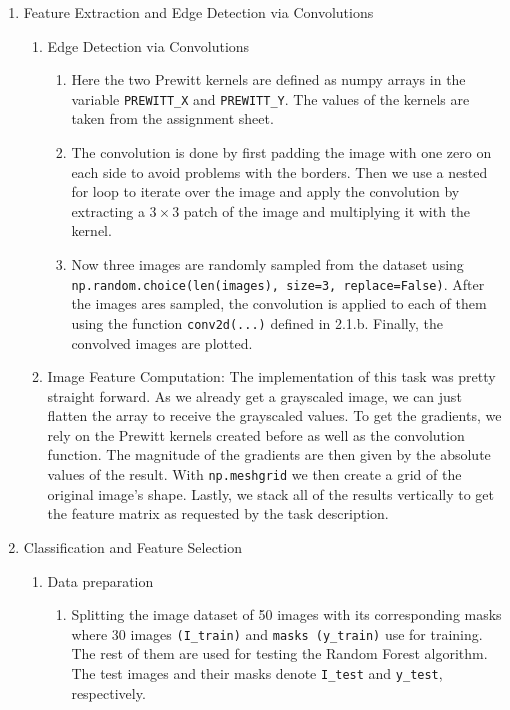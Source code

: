 \documentclass[
    a4paper,
    12pt,
    parskip=half,
]{scrarticle}
\begin{document}
\begin{enumerate}
    \item Feature Extraction and Edge Detection via Convolutions
    \begin{enumerate}[label=\theenumi.\arabic*.]
        \item Edge Detection via Convolutions
        \begin{enumerate}[label=\alph*)]
            \item Here the two Prewitt kernels are defined as numpy arrays in the variable \texttt{PREWITT\_X} and \texttt{PREWITT\_Y}.
            The values of the kernels are taken from the assignment sheet.
            \item The convolution is done by first padding the image with one zero on each side to avoid problems with the borders.
            Then we use a nested for loop to iterate over the image and apply the convolution by extracting  a \(3 \times 3\) patch of the image and multiplying it with the kernel.
            \item Now three images are randomly sampled from the dataset using \\ \texttt{np.random.choice(len(images), size=3, replace=False)}.
            After the images ares sampled, the convolution is applied to each of them using the function \texttt{conv2d(...)} defined in 2.1.b.
            Finally, the convolved images are plotted.
        \end{enumerate}
        \item Image Feature Computation:
        The implementation of this task was pretty straight forward. As we already get a grayscaled image, we can just flatten the array to receive the grayscaled values. To get the gradients, we rely on the Prewitt kernels created before as well as the convolution function. The magnitude of the gradients are then given by the absolute values of the result. With \texttt{np.meshgrid} we then create a grid of the original image's shape. Lastly, we stack all of the results vertically to get the feature matrix as requested by the task description.
    \end{enumerate}

    \item Classification and Feature Selection
    \begin{enumerate}[label=\theenumi.\arabic*.]
        \item Data preparation
        \begin{enumerate}[label=\alph*)]
            \item Splitting the image dataset of 50 images with its corresponding masks where 30 images \texttt{(I\_train)}  and \texttt{masks (y\_train)} use for training. The rest of them are used for testing the Random Forest algorithm. The test images and their masks denote \texttt{I\_test} and \texttt{y\_test}, respectively.


\end{enumerate}
\end{enumerate}
\end{enumerate}
\end{document}
